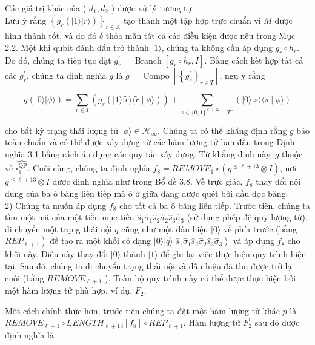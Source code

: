 \documentclass[10pt]{article}
\begin{document}
Các giá trị khác của ( $d_{1}, d_{2}$ ) được xử lý tương tự.\\
Lưu ý rằng $\left\{g_{r}(|1\rangle|\tilde{r}\rangle)\right\}_{r \in A}$ tạo thành một tập hợp trực chuẩn vì $M$ được hình thành tốt, và do đó $\delta$ thỏa mãn tất cả các điều kiện được nêu trong Mục 2.2. Một khi qubit đánh dấu trở thành $|1\rangle$, chúng ta không cần áp dụng $g_{r} \circ h_{r}$. Do đó, chúng ta tiếp tục đặt $g_{r}^{\prime}=\operatorname{Branch}\left[g_{r} \circ h_{r}, I\right]$. Bằng cách kết hợp tất cả các $g_{r}^{\prime}$, chúng ta định nghĩa $g$ là $g=\operatorname{Compo}\left[\left\{g_{r}^{\prime}\right\}_{r \in T}\right]$, ngụ ý rằng

$$
g(|0\rangle|\phi\rangle)=\sum_{r \in T}\left(g_{r}(|1\rangle|\tilde{r}\rangle\langle\tilde{r} \mid \phi\rangle)\right)+\sum_{s \in\{0,1\}^{\ell+12}-T^{\diamond}}(|0\rangle|s\rangle\langle s \mid \phi\rangle)
$$

cho bất kỳ trạng thái lượng tử $|\phi\rangle \in \mathcal{H}_{\infty}$. Chúng ta có thể khẳng định rằng $g$ bảo toàn chuẩn và có thể được xây dựng từ các hàm lượng tử ban đầu trong Định nghĩa 3.1 bằng cách áp dụng các quy tắc xây dựng. Từ khẳng định này, $g$ thuộc về $\widehat{\square_{1}^{\mathrm{QP}}}$. Cuối cùng, chúng ta định nghĩa $f_{8}=R E M O V E_{1} \circ\left(g^{\leq \ell+13} \otimes I\right)$, nơi $g^{\leq \ell+13} \otimes I$ được định nghĩa như trong Bổ đề 3.8. Về trực giác, $f_{8}$ thay đổi nội dung của ba ô băng liên tiếp mà ô ở giữa đang được quét bởi đầu đọc băng.\\
2) Chúng ta muốn áp dụng $f_{8}$ cho tất cả ba ô băng liên tiếp. Trước tiên, chúng ta tìm một mã của một tiền mục tiêu $\hat{s}_{1} \hat{\sigma}_{1} \hat{s}_{2} \hat{\sigma}_{2} \hat{s}_{3} \hat{\sigma}_{3}$ (sử dụng phép đệ quy lượng tử), di chuyển một trạng thái nội $q$ cũng như một dấu hiệu $|0\rangle$ về phía trước (bằng $\left.R E P_{\ell+1}\right)$ để tạo ra một khối có dạng $|0\rangle|q\rangle\left|\hat{s}_{1} \hat{\sigma}_{1} \hat{s}_{2} \hat{\sigma}_{2} \hat{s}_{3} \hat{\sigma}_{3}\right\rangle$ và áp dụng $f_{8}$ cho khối này. Điều này thay đổi $|0\rangle$ thành $|1\rangle$ để ghi lại việc thực hiện quy trình hiện tại. Sau đó, chúng ta di chuyển trạng thái nội và dấu hiệu đã thu được trở lại cuối (bằng $R E M O V E_{\ell+1}$ ). Toàn bộ quy trình này có thể được thực hiện bởi một hàm lượng tử phù hợp, ví dụ, $F_{2}$.

Một cách chính thức hơn, trước tiên chúng ta đặt một hàm lượng tử khác $p$ là $R E M O V E_{\ell+1} \circ L E N G T H_{\ell+13}\left[f_{8}\right] \circ R E P_{\ell+1}$. Hàm lượng tử $F_{2}^{\prime}$ sau đó được định nghĩa là
\end{document}
